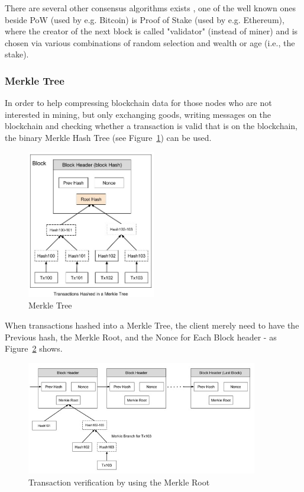 \documentclass[a4paper]{article}
\begin{document}
There are several other consensus algorithms exists \cite{consensus}, one of the well known ones beside PoW (used by e.g. Bitcoin) is Proof of Stake (used by e.g. Ethereum), where the creator of the next block is called "validator" (instead of miner) and is chosen via various combinations of random selection and wealth or age (i.e., the stake).  

\subsubsection{Merkle Tree}

In order to help compressing blockchain data for those nodes who are not interested in mining, but only exchanging goods, writing messages on the blockchain and checking whether a transaction is valid that is on the blockchain, the binary Merkle Hash Tree (see Figure~\ref{fig:merkle}) can be used.

\begin{figure}[H]
    \centering
    \includegraphics[width=0.5\textwidth]{figures/merkle_tree.jpg}
    \caption{Merkle Tree \cite{tutorialspoint}}
    \label{fig:merkle}
\end{figure}

When transactions hashed into a Merkle Tree, the client merely need to have the Previous hash, the Merkle Root, and the Nonce for Each Block header - as Figure~\ref{fig:merkle_verif} shows. 

\begin{figure}[H]
    \centering
    \includegraphics[width=0.9\textwidth]{figures/payment_verification.jpg}
    \caption{Transaction verification by using the Merkle Root \cite{tutorialspoint}}
    \label{fig:merkle_verif}
\end{figure}
\end{document}
